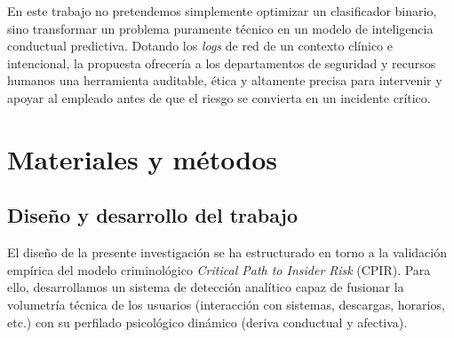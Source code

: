 \documentclass[IB]{TFUOC}%
\begin{document}
\noindent En este trabajo no pretendemos simplemente optimizar un clasificador binario, sino transformar un problema puramente técnico en un modelo de inteligencia conductual predictiva. Dotando los \textit{logs} de red de un contexto clínico e intencional, la propuesta ofrecería a los departamentos de seguridad y recursos humanos una herramienta auditable, ética y altamente precisa para intervenir y apoyar al empleado antes de que el riesgo se convierta en un incidente crítico.



\chapter{Materiales y métodos}

\section{Diseño y desarrollo del trabajo} 
El diseño de la presente investigación se ha estructurado en torno a la validación empírica del modelo criminológico \textit{Critical Path to Insider Risk} (CPIR). Para ello, desarrollamos un sistema de detección analítico capaz de fusionar la volumetría técnica de los usuarios (interacción con sistemas, descargas, horarios, etc.) con su perfilado psicológico dinámico (deriva conductual y afectiva).
\end{document}
